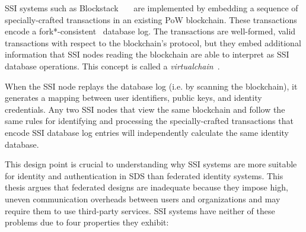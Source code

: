 SSI systems such as
Blockstack~\cite{blockstack}~\cite{ali2017}~\cite{blockstack-whitepaper}
are implemented by embedding a sequence of specially-crafted transactions
in an existing PoW blockchain.  These transactions encode a
fork*-consistent~\cite{fork-star-consistent} database log.  The transactions are
well-formed, valid transactions with respect to the blockchain's protocol,
but they embed additional information that SSI nodes reading the blockchain
are able to interpret as SSI database operations.  This concept is called
a \emph{virtualchain}~\cite{virtualchain}.

When the SSI node replays the database log (i.e. by scanning the blockchain), it
generates a mapping between user identifiers, public keys, and identity
credentials.  Any two SSI nodes that view the same blockchain and follow the
same rules for identifying and processing the specially-crafted transactions
that encode SSI database log entries will independently
calculate the same identity database.

This design point is crucial to understanding why SSI systems are
more suitable for identity and authentication in SDS than federated identity
systems.  This thesis argues that federated designs are inadequate because they
impose high, uneven communication overheads between users and organizations and
may require them to use third-party services.  SSI systems have neither of these
problems due to four properties they exhibit:

